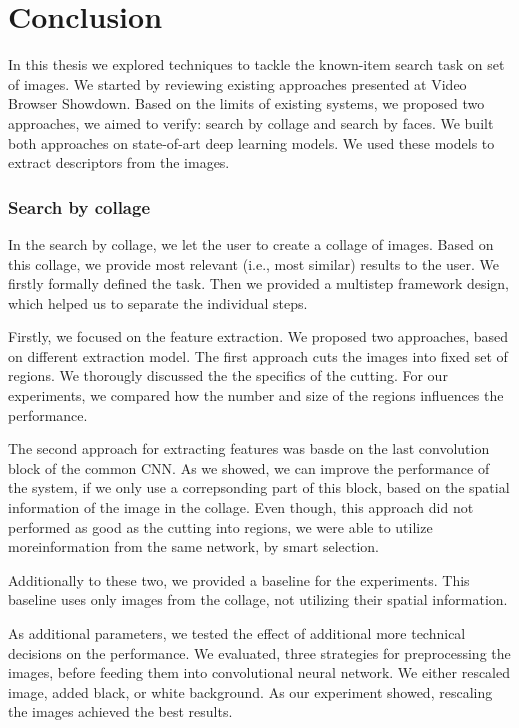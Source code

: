 \chapter*{Conclusion}

In this thesis we explored techniques to tackle the known-item search task on set of images. We started by reviewing existing approaches presented at Video Browser Showdown. Based on the limits of existing systems, we proposed two approaches, we aimed to verify: search by collage and search by faces. We built both approaches on state-of-art deep learning models. We used these models to extract descriptors from the images. 

\subsection*{Search by collage}

In the search by collage, we let the user to create a collage of images. Based on this collage, we provide most relevant (i.e., most similar) results to the user. We firstly formally defined the task. Then we provided a multistep framework design, which helped us to separate the individual steps.

Firstly, we focused on the feature extraction. We proposed two approaches, based on different extraction model. The first approach cuts the images into fixed set of regions. We thorougly discussed the the specifics of the cutting. For our experiments, we compared how the number and size of the regions influences the performance.

The second approach for extracting features was basde on the last convolution block of the common CNN. As we showed, we can improve the performance of the system, if we only use a correpsonding part of this block, based on the spatial information of the image in the collage. Even though, this approach did not performed as good as the cutting into regions, we were able to utilize moreinformation from the same network, by smart selection.

Additionally to these two, we provided a baseline for the experiments. This baseline uses only images from the collage, not utilizing their spatial information.

As additional parameters, we tested the effect of additional more technical decisions on the performance. We evaluated, three strategies for preprocessing the images, before feeding them into convolutional neural network. We either rescaled image, added black, or white background. As our experiment showed, rescaling the images achieved the best results.

